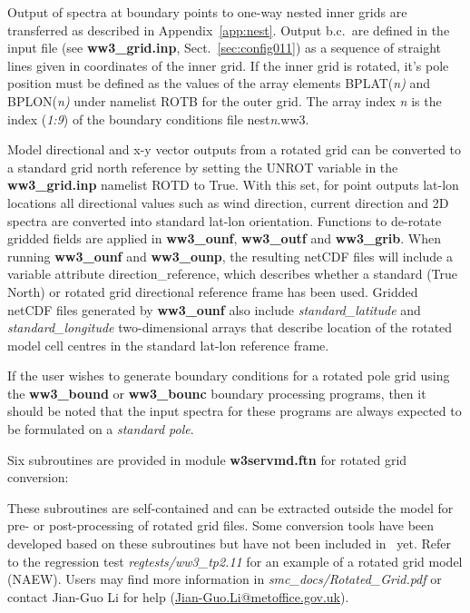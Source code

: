 Output of spectra at boundary points to one-way nested inner grids are transferred
as described in Appendix~\ref{app:nest}. Output b.c.\ are defined in the input
file (see {\bf ww3\_grid.inp}, Sect.~\ref{sec:config011}) as a sequence of straight
lines given in coordinates of the inner grid. If the inner grid is rotated, it's
pole position must be defined as the values of the array elements
{\code BPLAT(\sl{n})} and {\code BPLON(\sl{n})} under namelist {\code ROTB}
for the outer grid. The array index {\sl{n}} is the index ({\sl{1:9}}) of the boundary
conditions file {\file nest{\sl{n}}.ww3}.

Model directional and x-y vector outputs from a rotated grid can be converted
to a standard grid north reference by setting the UNROT variable in the
{\bf ww3\_grid.inp} namelist ROTD to True. With this set, for point outputs
lat-lon locations all directional
values such as wind direction, current direction and 2D spectra are converted
into standard lat-lon orientation. Functions to de-rotate gridded
fields are applied in {\bf ww3\_ounf}, {\bf ww3\_outf} and {\bf ww3\_grib}. 
When running {\bf ww3\_ounf} and {\bf ww3\_ounp}, the resulting netCDF
files will include a variable attribute direction\_reference, which describes
whether a standard (True North) or rotated grid directional reference frame
has been used. Gridded netCDF files generated by {\bf ww3\_ounf} also include
\emph{standard\_latitude} and \emph{standard\_longitude} two-dimensional arrays
that describe location of the rotated model cell centres in the standard lat-lon
reference frame.

If the user wishes to generate boundary conditions for a rotated pole grid using
the {\bf ww3\_bound} or {\bf ww3\_bounc} boundary processing programs, then it
should be noted that the input spectra for these programs are always expected
to be formulated on a \emph{standard pole}.

Six subroutines are provided in module {\bf w3servmd.ftn} for rotated grid
conversion:
\begin{vlist}
\end{vlist}
These subroutines are self-contained and can be extracted outside the model
for pre- or post-processing of rotated grid files.  Some conversion tools have
been developed based on these subroutines but have not been included in \ws\
yet. Refer to the regression test \emph{regtests/ww3\_tp2.11} for an example
of a rotated grid model (NAEW).  Users may find more information in
\emph{smc\_docs/Rotated\_Grid.pdf} or contact Jian-Guo Li for help
(\url{Jian-Guo.Li@metoffice.gov.uk}).

